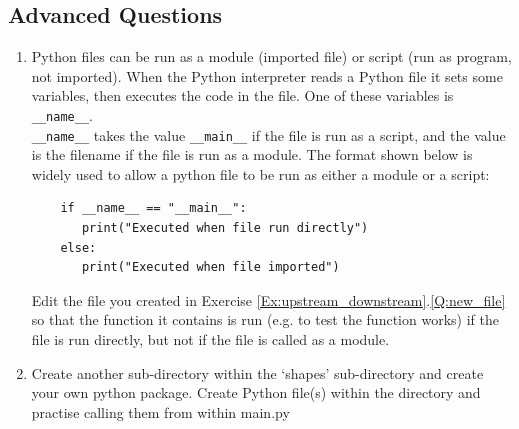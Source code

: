 \documentclass[11pt]{report}
\begin{document}
\subsection*{Advanced Questions}

\begin{enumerate}[label=(\Alph*)]
    
    \item Python files can be run as a module (imported file) or script (run as program, not imported). When the Python interpreter reads a Python file it sets some variables, then executes the code in the file. One of these variables is {\tt \_\_name\_\_}.\\ {\tt \_\_name\_\_} takes the value {\tt \_\_main\_\_} if the file is run as a script, and the value is the filename if the file is run as a module. The format shown below is widely used to allow a python file to be run as either a module or a script:
    
    \begin{verbatim}
    if __name__ == "__main__":
       print("Executed when file run directly")
    else:
       print("Executed when file imported")
    \end{verbatim}
    
    Edit the file you created in Exercise \ref{Ex:upstream_downstream}.\ref{Q:new_file} so that the function it contains is run (e.g. to test the function works) if the file is run directly, but not if the file is called as a module. 
    
    
    
    
    
    
    
    
    
    

    \item Create another sub-directory within the `shapes' sub-directory and create your own python package. Create Python file(s) within the directory and practise calling them from within main.py
    
    
\end{enumerate}
\end{document}
